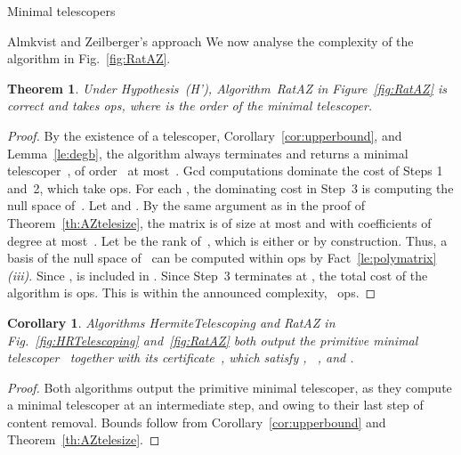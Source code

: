 \documentclass{sig-alt-full}
\newtheorem{theorem}[lemma]{Theorem}
\newtheorem{cor}[lemma]{Corollary}
\begin{document}
\begin{section}{Minimal telescopers}
\begin{subsection}{Almkvist and Zeilberger's approach}
We now analyse the complexity of the algorithm in
Fig.~\ref{fig:RatAZ}.

\begin{theorem}
Under Hypothesis~(H'),
Algorithm~\textsf{RatAZ} in Figure~\ref{fig:RatAZ} is correct and takes
 ops, where  is the
order of the minimal telescoper.
\end{theorem}
\begin{proof}
By the existence of a telescoper, Corollary~\ref{cor:upperbound}, and
Lemma~\ref{le:degb}, the algorithm
always terminates and returns a minimal telescoper~,
of order~ at most~.
Gcd computations dominate the cost of Steps 1 and~2, which
take  ops.
For each , the dominating cost in Step~3 is
computing the null space of~.
Let  and . By the same argument as
in the proof of Theorem~\ref{th:AZtelesize}, the matrix  is of
size at most  and with coefficients of
degree at most~.
Let  be the rank of~, which is either  or
 by construction.
Thus, a basis of the null space of~ can
be computed within  ops
by Fact~\ref{le:polymatrix}\emph{(iii)}. Since ,  is included in
.
Since Step~3
terminates at , the total cost of the algorithm is
 ops.
This is within the announced complexity,
~ops.
\end{proof}

\begin{cor}
Algorithms \textsf{HermiteTelescoping} and \textsf{RatAZ} in
Fig.\ \ref{fig:HRTelescoping} and~\ref{fig:RatAZ} both output the
primitive minimal telescoper~ together with its certificate~,
which satisfy ,
\ , and
.
\end{cor}

\begin{proof}
Both algorithms output the primitive minimal telescoper, as they
compute a minimal telescoper at an intermediate step, and
owing to their last step of content removal.
Bounds follow from Corollary~\ref{cor:upperbound} and
Theorem~\ref{th:AZtelesize}.
\end{proof}

\end{subsection}

\end{section}
\end{document}
